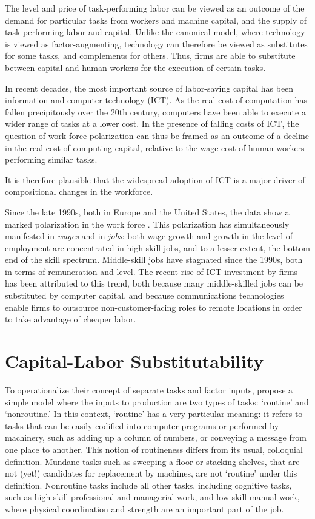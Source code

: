 The level and price of task-performing labor can be viewed as an outcome of the demand for particular tasks from workers and machine capital, and the supply of task-performing labor and capital. Unlike the canonical model, where technology is viewed as factor-augmenting,  technology can therefore be viewed as substitutes for some tasks, and complements for others. Thus, firms are able to substitute between capital and human workers for the execution of certain tasks.

In recent decades, the most important source of labor-saving capital has been information and computer technology (ICT). As the real cost of computation has fallen precipitously over the 20th century, computers have been able to execute a wider range of tasks at a lower cost. In the presence of falling costs of ICT, the question of work force polarization can thus be framed as an outcome of a decline in the real cost of computing capital, relative to the wage cost of human workers performing similar tasks.

It is therefore plausible that the widespread adoption of ICT is a major driver of compositional changes in the workforce. 

Since the late 1990s, both in Europe and the United States, the data show a marked polarization in the work force \citep{Goos2007, Autor2006}. This polarization has simultaneously manifested in \emph{wages} and in \emph{jobs}: both wage growth and growth in the level of employment are concentrated in high-skill jobs, and to a lesser extent, the bottom end of the skill spectrum. Middle-skill jobs have stagnated since the 1990s, both in terms of remuneration and level. The recent rise of ICT investment by firms has been attributed to this trend, both because many middle-skilled jobs can be substituted by computer capital, and because communications technologies enable firms to outsource non-customer-facing roles to remote locations in order to take advantage of cheaper labor.

\section{Capital-Labor Substitutability}

To operationalize their concept of separate tasks and factor inputs, \citet{Levy2003} propose a simple model where the inputs to production are two types of tasks: `routine' and `nonroutine.' In this context, `routine' has a very particular meaning: it refers to tasks that can be easily codified into computer programs or performed by machinery, such as adding up a column of numbers, or conveying a message from one place to another. This notion of routineness differs from its usual, colloquial definition. Mundane tasks such as sweeping a floor or stacking shelves, that are not (yet!) candidates for replacement by machines, are not `routine' under this definition. Nonroutine tasks include all other tasks, including cognitive tasks, such as high-skill professional and managerial work, and low-skill manual work, where physical coordination and strength are an important part of the job. 

